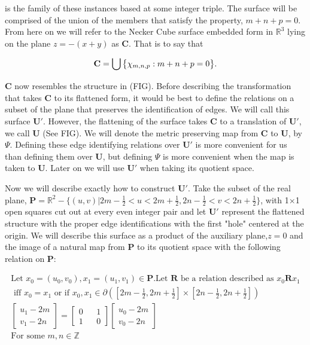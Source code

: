 \documentclass[]{article}
\begin{document}
is the family of these instances based at some integer triple. The surface will be comprised of the union of the members that satisfy the property, $m+n+p=0$. From here on we will refer to the Necker Cube surface embedded form in $\mathbb{R}^{3}$ lying on the plane $z=-(x+y) $ as $\mathbf{C}$. That is to say that

$$\mathbf{C} =\bigcup\big{\{}\chi_{m,n,p}  : m+n+p=0 \big{\}} .$$

$\mathbf{C}$ now resembles the structure in (FIG). Before describing the transformation that takes $\mathbf{C}$ to its flattened form, it would be best to define the relations on a subset of the plane that preserves the identification of edges. We will call this surface $\mathbf{U}'$. However, the flattening of the surface takes $\mathbf{C}$ to a translation of $\mathbf{U}'$, we call $\mathbf{U}$ (See FIG). We will denote the metric preserving map from $\mathbf{C}$ to $\mathbf{U}$, by $\Psi$. Defining these edge identifying relations over $\mathbf{U}'$ is more convenient for us than defining them over $\mathbf{U}$, but defining $\Psi$ is more convenient when the map is taken to $\mathbf{U}$. Later on we will use $\mathbf{U}'$ when taking its quotient space.

Now we will describe exactly how to construct $\mathbf{U}'$. Take the subset of the real plane, $\mathbf{P} = \mathbb{R}^{2}-\{(u,v)|2m-\frac{1}{2}<u<2m+\frac{1}{2}, 2n-\frac{1}{2}<v<2n+\frac{1}{2} \}$, with 1$\times$1 open squares cut out at every even integer pair and let $\mathbf{U}'$ represent the flattened structure with the proper edge identifications with the first "hole" centered at the origin. We will describe this surface as a product of the auxiliary plane,$z=0$ and the image of a natural map from $\mathbf{P}$ to its quotient space with the following relation on $\mathbf{P}$:

\begin{gather*}
\text{Let } x_{0}=(u_{0},v_{0}),x_{1}=(u_{1},v_{1}) \in \mathbf{P}. \text{Let } \mathbf{R} \text { be a relation described as } x_{0}\mathbf{R}x_{1} \\ \text{ iff } x_{0}=x_{1}
 \text{ or if }x_{0},x_{1} \in {\partial} \left( \left[2m-\frac{1}{2},2m+\frac{1}{2}\right] \times \left[2n-\frac{1}{2},2n+\frac{1}{2}\right] \right)\\
  \left[\begin{array}{c}
u_{1} -2m
\\v_{1}-2n
\end{array}\right] = \left[\begin{matrix}
0 && 1\\
1 && 0
\end{matrix}\right]
\left[ \begin{array}{c}u_{0}-2m\\
v_{0}-2n
\end{array}\right]
\\\text{For some }m,n\in\mathbb{Z} \end{gather*}
\end{document}
